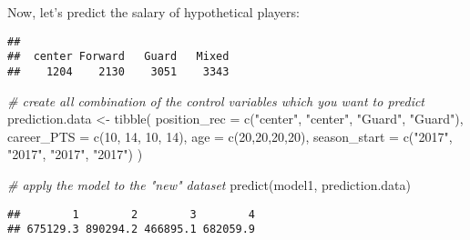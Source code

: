 \documentclass[
]{book}
\newenvironment{Shaded}{\begin{snugshade}}{\end{snugshade}}
\newcommand{\AttributeTok}[1]{\textcolor[rgb]{0.77,0.63,0.00}{#1}}
\newcommand{\AttributeTok}[1]{\textcolor[rgb]{0.13,0.29,0.53}{#1}}
\newcommand{\CommentTok}[1]{\textcolor[rgb]{0.56,0.35,0.01}{\textit{#1}}}
\newcommand{\DecValTok}[1]{\textcolor[rgb]{0.00,0.00,0.81}{#1}}
\newcommand{\FunctionTok}[1]{\textcolor[rgb]{0.00,0.00,0.00}{#1}}
\newcommand{\FunctionTok}[1]{\textcolor[rgb]{0.13,0.29,0.53}{\textbf{#1}}}
\newcommand{\NormalTok}[1]{#1}
\newcommand{\OtherTok}[1]{\textcolor[rgb]{0.56,0.35,0.01}{#1}}
\newcommand{\SpecialCharTok}[1]{\textcolor[rgb]{0.00,0.00,0.00}{#1}}
\newcommand{\SpecialCharTok}[1]{\textcolor[rgb]{0.81,0.36,0.00}{\textbf{#1}}}
\newcommand{\StringTok}[1]{\textcolor[rgb]{0.31,0.60,0.02}{#1}}
\begin{document}
Now, let's predict the salary of hypothetical players:

\begin{Shaded}
\end{Shaded}

\begin{verbatim}
## 
##  center Forward   Guard   Mixed 
##    1204    2130    3051    3343
\end{verbatim}

\begin{Shaded}
\begin{Highlighting}[]
\CommentTok{\# create all combination of the control variables which you want to predict}
\NormalTok{prediction.data }\OtherTok{\textless{}{-}} \FunctionTok{tibble}\NormalTok{(}
  \AttributeTok{position\_rec =} \FunctionTok{c}\NormalTok{(}\StringTok{"center"}\NormalTok{, }\StringTok{"center"}\NormalTok{, }\StringTok{"Guard"}\NormalTok{, }\StringTok{"Guard"}\NormalTok{),}
  \AttributeTok{career\_PTS =} \FunctionTok{c}\NormalTok{(}\DecValTok{10}\NormalTok{, }\DecValTok{14}\NormalTok{, }\DecValTok{10}\NormalTok{, }\DecValTok{14}\NormalTok{),}
  \AttributeTok{age =} \FunctionTok{c}\NormalTok{(}\DecValTok{20}\NormalTok{,}\DecValTok{20}\NormalTok{,}\DecValTok{20}\NormalTok{,}\DecValTok{20}\NormalTok{),}
  \AttributeTok{season\_start =} \FunctionTok{c}\NormalTok{(}\StringTok{"2017"}\NormalTok{, }\StringTok{"2017"}\NormalTok{, }\StringTok{"2017"}\NormalTok{, }\StringTok{"2017"}\NormalTok{)}
\NormalTok{)}

\CommentTok{\# apply the model to the "new" dataset}
\FunctionTok{predict}\NormalTok{(model1, }
\NormalTok{        prediction.data)}
\end{Highlighting}
\end{Shaded}

\begin{verbatim}
##        1        2        3        4 
## 675129.3 890294.2 466895.1 682059.9
\end{verbatim}

\begin{Shaded}
\end{Shaded}
\end{document}
